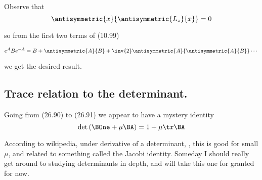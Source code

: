 Observe that 
\begin{equation}\label{eqn:desaiCh26:110}
\antisymmetric{x}{\antisymmetric{L_z}{x}} = 0
\end{equation}

so from the first two terms of (10.99) 

\begin{equation}\label{eqn:desaiCh26:120}
e^{A} B e^{-A}
= B + \antisymmetric{A}{B}
+\inv{2} \antisymmetric{A}{\antisymmetric{A}{B}} \cdots
\end{equation}

we get the desired result.

\subsection{Trace relation to the determinant.}

Going from (26.90) to (26.91) we appear to have a mystery identity
\begin{equation}\label{eqn:desaiCh26:130}
\det \left( \BOne + \mu \BA \right) = 1 + \mu \tr \BA
\end{equation}

According to wikipedia, under derivative of a determinant, \cite{wiki:determinant}, this is good for small $\mu$, and related to something called the Jacobi identity.  Someday I should really get around to studying determinants in depth, and will take this one for granted for now.

\EndArticle
